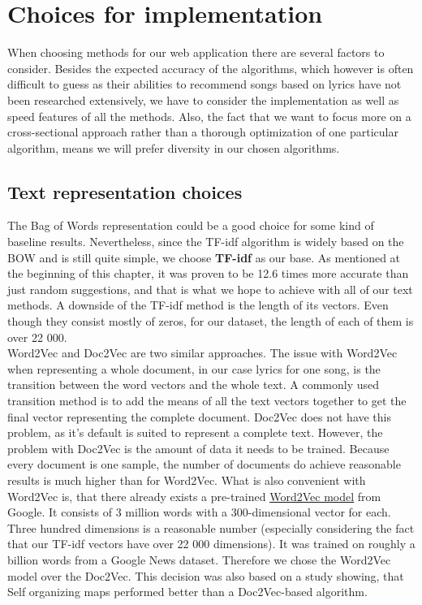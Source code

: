 \section{Choices for implementation}
When choosing methods for our web application there are several factors to consider. Besides the expected accuracy of the algorithms, which however is often difficult to guess as their abilities to recommend songs based on lyrics have not been researched extensively, we have to consider the implementation as well as speed  features of all the methods. Also, the fact that we want to focus more on a cross-sectional approach rather than a thorough optimization of one particular algorithm, means we will prefer diversity in our chosen algorithms. 
\subsection{Text representation choices}
The Bag of Words representation could be a good choice for some kind of baseline results. Nevertheless, since the TF-idf algorithm is widely based on the BOW and is still quite simple, we choose \textbf{TF-idf} as our base. As mentioned at the beginning of this chapter, it was proven to be 12.6 times more accurate than just random suggestions, and that is what we hope to achieve with all of our text methods. A downside of the TF-idf method is the length of its vectors. Even though they consist mostly of zeros, for our dataset, the length of each of them is over 22 000. \\

Word2Vec and Doc2Vec are two similar approaches. The issue with Word2Vec when representing a whole document, in our case lyrics for one song, is the transition between the word vectors and the whole text. A commonly used transition method is to add the means of all the text vectors together to get the final vector representing the complete document. Doc2Vec does not have this problem, as it's default is suited to represent a complete text. However, the problem with Doc2Vec is the amount of data it needs to be trained. Because every document is one sample, the number of documents do achieve reasonable results is much higher than for Word2Vec. What is also convenient with Word2Vec is, that there already exists a pre-trained \underline{\color{blue}\href{https://code.google.com/archive/p/word2vec/}{Word2Vec model}} from Google. It consists of 3 million words with a 300-dimensional vector for each. Three hundred dimensions is a reasonable number (especially considering the fact that our TF-idf vectors have over 22 000 dimensions). It was trained on roughly a billion words from a Google News dataset. Therefore we chose the Word2Vec model over the Doc2Vec. This decision was also based on a study \cite{inproceedings} showing, that Self organizing maps performed better than a Doc2Vec-based algorithm. \\

